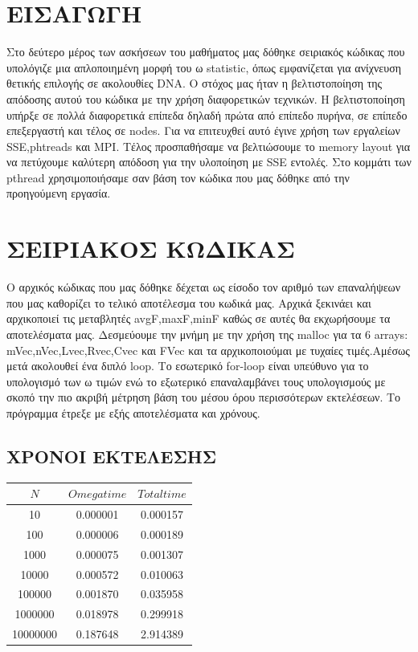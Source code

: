 \documentclass{FR16}
\begin{document}
\maketitle

\newpage

\section{ΕΙΣΑΓΩΓΗ}
Στο δεύτερο μέρος των ασκήσεων του μαθήματος μας δόθηκε σειριακός κώδικας που υπολόγιζε μια απλοποιημένη μορφή του ω statistic, όπως εμφανίζεται για ανίχνευση θετικής επιλογής σε ακολουθίες DNA. Ο στόχος μας ήταν η βελτιστοποίηση της απόδοσης αυτού του κώδικα με την χρήση διαφορετικών τεχνικών. Η βελτιστοποίηση υπήρξε σε πολλά διαφορετικά επίπεδα δηλαδή πρώτα από επίπεδο πυρήνα, σε επίπεδο επεξεργαστή και τέλος σε nodes. Για να επιτευχθεί αυτό έγινε χρήση των εργαλείων SSE,phtreads και MPI. Τέλος προσπαθήσαμε να βελτιώσουμε το memory layout για να πετύχουμε καλύτερη απόδοση για την υλοποίηση με SSE εντολές. Στο κομμάτι των pthread χρησιμοποιήσαμε σαν βάση τον κώδικα που μας δόθηκε από την προηγούμενη εργασία.
\newpage

\section{ΣΕΙΡΙΑΚΟΣ ΚΩΔΙΚΑΣ}
Ο αρχικός κώδικας που μας δόθηκε δέχεται ως είσοδο τον αριθμό των επαναλήψεων που μας καθορίζει το τελικό αποτέλεσμα του κωδικά μας. Αρχικά ξεκινάει και αρχικοποιεί τις μεταβλητές avgF,maxF,minF καθώς σε αυτές θα εκχωρήσουμε τα αποτελέσματα μας. Δεσμεύουμε την μνήμη με την χρήση της malloc για τα 6 arrays: mVec,nVec,Lvec,Rvec,Cvec και FVec και τα αρχικοποιούμαι με τυχαίες τιμές.Αμέσως μετά ακολουθεί ένα διπλό loop. Tο εσωτερικό for-loop είναι υπεύθυνο για το υπολογισμό των ω τιμών ενώ το εξωτερικό επαναλαμβάνει τους υπολογισμούς με σκοπό την πιο ακριβή μέτρηση βάση του μέσου όρου περισσότερων εκτελέσεων. 
Το πρόγραμμα έτρεξε με εξής αποτελέσματα και χρόνους.
\subsection{ΧΡΟΝΟΙ ΕΚΤΕΛΕΣΗΣ}
\begin{center}
\begin{tabular}{c c c}
\arrayrulecolor{Azzurro}
\hline
{\bfseries $Ν$} & {\bfseries $Omega time$} & {\bfseries $Total time$}\\
\hline
10    & 0.000001 & 0.000157 \\
100   & 0.000006 & 0.000189 \\
1000  & 0.000075 & 0.001307 \\
10000 & 0.000572 & 0.010063 \\
100000 & 0.001870 & 0.035958 \\
1000000 & 0.018978 & 0.299918 \\
10000000 & 0.187648 & 2.914389 \\
\hline
\end{tabular}
\end{center}
\end{document}
